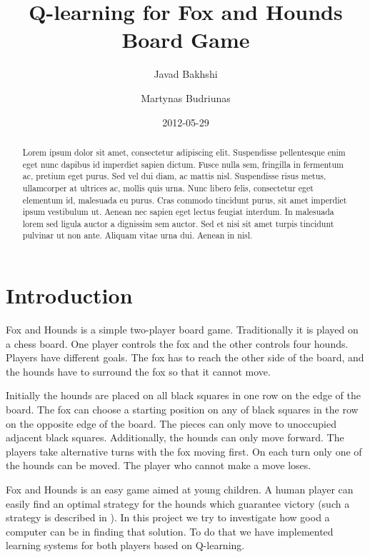 \documentclass[a4paper]{article}
\title{Q-learning for Fox and Hounds Board Game}
\author{Javad Bakhshi \and Martynas Budriunas}
\date{2012-05-29}
\begin{document}
\maketitle

\begin{abstract}
Lorem ipsum dolor sit amet, consectetur adipiscing elit. Suspendisse
pellentesque enim eget nunc dapibus id imperdiet sapien dictum. Fusce nulla
sem, fringilla in fermentum ac, pretium eget purus. Sed vel dui diam, ac mattis
nisl. Suspendisse risus metus, ullamcorper at ultrices ac, mollis quis urna.
Nunc libero felis, consectetur eget elementum id, malesuada eu purus. Cras
commodo tincidunt purus, sit amet imperdiet ipsum vestibulum ut. Aenean nec
sapien eget lectus feugiat interdum. In malesuada lorem sed ligula auctor a
dignissim sem auctor. Sed et nisi sit amet turpis tincidunt pulvinar ut non
ante. Aliquam vitae urna dui. Aenean in nisl. 
\end{abstract}

\section{Introduction}
Fox and Hounds is a simple two-player board game. Traditionally it is played on
a chess board. One player controls the fox and the other controls four hounds.
Players have different goals. The fox has to reach the other side of the board,
and the hounds have to surround the fox so that it cannot move.

Initially the hounds are placed on all black squares in one row on the edge of
the board. The fox can choose a starting position on any of black squares in the
row on the opposite edge of the board. The pieces can only move to unoccupied
adjacent black squares. Additionally, the hounds can only move forward. The
players take alternative turns with the fox moving first. On each turn only one
of the hounds can be moved. The player who cannot make a move loses.

Fox and Hounds is an easy game aimed at young children. A human player can
easily find an optimal strategy for the hounds which guarantee victory (such a
strategy is described in \cite{berlekamp82}). In this project we try to
investigate how good a computer can be in finding that solution. To do that we
have implemented learning systems for both players based on Q-learning.
\end{document}
